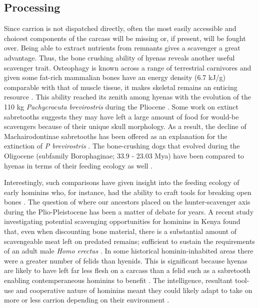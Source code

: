 \documentclass[a4paper,12pt]{article}
\begin{document}
\subsection*{Processing}
Since carrion is not dispatched directly, often the most easily accessible and choicest components of the carcass will be missing or, if present, will be fought over.
Being able to extract nutrients from remnants gives a scavenger a great advantage.
Thus, the bone crushing ability of hyenas reveals another useful scavenger trait.
Osteophagy is known across a range of terrestrial carnivores and given some fat-rich mammalian bones have an energy density (6.7 kJ/g) comparable with that of muscle tissue, it makes skeletal remains an enticing resource \citep{brown1989study}.
This ability reached its zenith among hyenas with the evolution of the 110 kg \textit{Pachycrocuta brevirostris} during the Pliocene \citep[3.6 - 2.58 Mya; ][]{palmqvist2011giant}.
Some work on extinct sabretooths suggests they may have left a large amount of food for would-be scavengers because of their unique skull morphology.
As a result, the decline of Machairodontinae sabretooths has been offered as an explanation for the extinction of \textit{P brevirostris} \citep{palmqvist2011giant}.
The bone-crushing dogs that evolved during the Oligocene (subfamily Borophaginae; 33.9 - 23.03 Mya) have been compared to hyenas in terms of their feeding ecology as well \citep{van2003chapter,martin2016pursuit}.


Interestingly, such comparisons have given insight into the feeding ecology of early hominins who, for instance, had the ability to craft tools for breaking open bones \citep{ARCM:ARCM12084}.
The question of where our ancestors placed on the hunter-scavenger axis during the Plio-Pleistocene has been a matter of debate for years.
A recent study investigating potential scavenging opportunities for hominins in Kenya found that, even when discounting bone material, there is a substantial amount of scavengeable meat left on predated remains; sufficient to sustain the requirements of an adult male \textit{Homo erectus} \citep{pobiner2015new}.
In some historical hominin-inhabited areas there were a greater number of felids than hyenids.
This is significant because hyenas are likely to have left far less flesh on a carcass than a felid such as a sabretooth enabling contemperaneous hominins to benefit \citep{pobiner2015new}.
The intelligence, resultant tool-use and cooperative nature of hominins meant they could likely adapt to take on more or less carrion depending on their environment \citep{moleon2014humans}.
\end{document}
